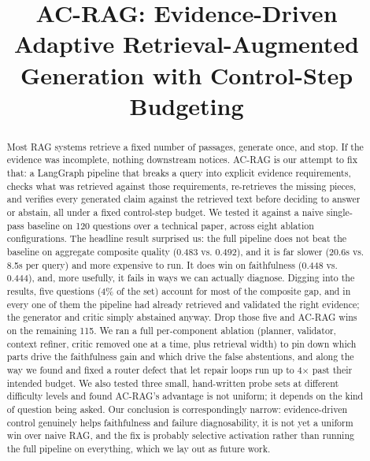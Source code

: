 \documentclass[conference]{IEEEtran}
\begin{document}
\title{AC-RAG: Evidence-Driven Adaptive Retrieval-Augmented Generation with Control-Step Budgeting}

\author{
}

\maketitle

\begin{abstract}
Most RAG systems retrieve a fixed number of passages, generate once, and stop. If
the evidence was incomplete, nothing downstream notices. AC-RAG is our attempt to
fix that: a LangGraph pipeline that breaks a query into explicit evidence
requirements, checks what was retrieved against those requirements, re-retrieves
the missing pieces, and verifies every generated claim against the retrieved text
before deciding to answer or abstain, all under a fixed control-step budget. We
tested it against a naive single-pass baseline on 120 questions over a technical
paper, across eight ablation configurations. The headline result surprised us: the
full pipeline does not beat the baseline on aggregate composite quality (0.483 vs.
0.492), and it is far slower (20.6s vs. 8.5s per query) and more expensive to run.
It does win on faithfulness (0.448 vs. 0.444), and, more usefully, it fails in ways
we can actually diagnose. Digging into the results, five questions (4\% of the set)
account for most of the composite gap, and in every one of them the pipeline had
already retrieved and validated the right evidence; the generator and critic simply
abstained anyway. Drop those five and AC-RAG wins on the remaining 115. We ran a
full per-component ablation (planner, validator, context refiner, critic removed
one at a time, plus retrieval width) to pin down which parts drive the faithfulness
gain and which drive the false abstentions, and along the way we found and fixed a
router defect that let repair loops run up to 4$\times$ past their intended budget.
We also tested three small, hand-written probe sets at different difficulty levels
and found AC-RAG's advantage is not uniform; it depends on the kind of question
being asked. Our conclusion is correspondingly narrow: evidence-driven control
genuinely helps faithfulness and failure diagnosability, it is not yet a uniform
win over naive RAG, and the fix is probably selective activation rather than
running the full pipeline on everything, which we lay out as future work.
\end{abstract}
\end{document}

